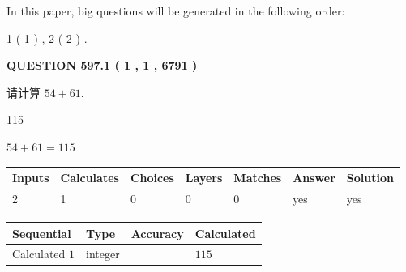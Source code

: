 \documentclass{ctexart}
\begin{document}
   
   
\vspace{0.2in}
   
In this paper, big questions will be generated in the following order: 
   
   
   1 ( 1 )
 ,
   2 ( 2 )
 .
  
\vspace{0.2in}
  
{\textbf{\Large{QUESTION
597.1 
 ( 1 , 1 , 6791 )
}}}
  
  
 
请计算 $ %
54 +  %
61 $.
 
 
 
\noindent{}
 
 

115
 
 
\noindent{}
 
 

 
 
 
\noindent{}
 
 

$ %
54 +  %
61=   %
115$
 
 
\noindent{}
 
 

 
   
   
   
   
\noindent\begin{tabular}{|l|l|l|l|l|l|l|}
 \hline
Inputs & Calculates & Choices & Layers & Matches & Answer & Solution \\ \hline
 2  & 
 1  & 
 0
  & 
 0  & 
 0  & 
  yes & 
  yes 
  \\ \hline
 \end{tabular}
   
   
   
   
\noindent{}
   
   
  
  
\noindent\begin{tabular}{|l|l|l|l|}
\hline
 Sequential & Type & Accuracy & Calculated \\ 
\hline
 
 
  Calculated $  1 $ & integer &  & 
  $ 115 $ 
 \\  \hline  
 \end{tabular}
   
\end{document}
